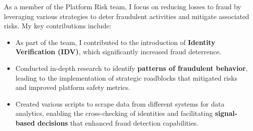 As a member of the Platform Risk team, I focus on reducing losses to fraud by leveraging various strategies to deter fraudulent activities and mitigate associated risks. My key contributions include:
\medskip
\begin{itemize}
    \item As part of the team, I contributed to the introduction of \textbf{Identity Verification (IDV)}, which significantly increased fraud deterrence.
    \item Conducted in-depth research to identify \textbf{patterns of fraudulent behavior}, leading to the implementation of strategic roadblocks that mitigated risks and improved platform safety metrics.
    \item Created various scripts to scrape data from different systems for data analytics, enabling the cross-checking of identities and facilitating \textbf{signal-based decisions} that enhanced fraud detection capabilities.
\end{itemize}
